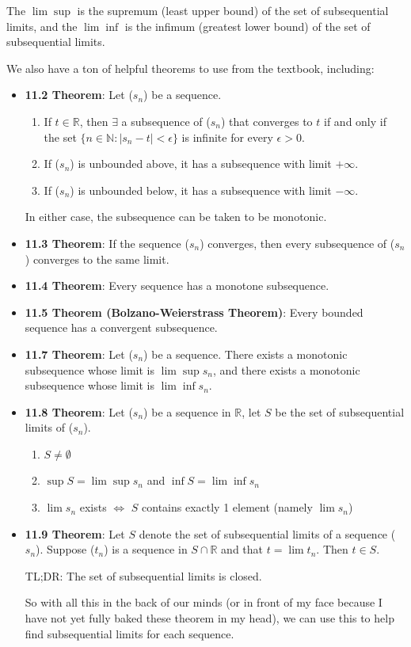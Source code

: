 \documentclass[12pt]{article}
\begin{document}
The $\lim \sup$ is the supremum (least upper bound) of the set of subsequential limits, and the $\lim \inf$ is the infimum (greatest lower bound) of the set of subsequential limits.
 
We also have a ton of helpful theorems to use from the textbook, including:
\begin{itemize}
    \item \textbf{11.2 Theorem}: Let ($s_n$) be a sequence. 
    \begin{enumerate}[label=(\roman*)]
        \item If $t \in \mathbb{R}$, then $\exists$ a subsequence of ($s_n$) that converges to $t$ if and only if the set $\{ n \in \mathbb{N} \colon | s_n - t | < \epsilon \}$ is infinite for every $\epsilon > 0$.
        \item If ($s_n$) is unbounded above, it has a subsequence with limit $+\infty$.
        \item If ($s_n$) is unbounded below, it has a subsequence with limit $-\infty$.
    \end{enumerate}
    \indent In either case, the subsequence can be taken to be monotonic.
    \item \textbf{11.3 Theorem}: If the sequence ($s_n$) converges, then every subsequence of ($s_n$) converges to the same limit.
    \item \textbf{11.4 Theorem}: Every sequence has a monotone subsequence.
    \item \textbf{11.5 Theorem (Bolzano-Weierstrass Theorem)}: Every bounded sequence has a convergent subsequence.
    \item \textbf{11.7 Theorem}: Let ($s_n$) be a sequence. There exists a monotonic subsequence whose limit is $\lim \sup s_n$, and there exists a monotonic subsequence whose limit is $\lim \inf s_n$.
    \item \textbf{11.8 Theorem}: Let ($s_n$) be a sequence in $\mathbb{R}$, let $S$ be the set of subsequential limits of ($s_n$).
    \begin{enumerate}[label=(\roman*)]
        \item $S \neq \emptyset$
        \item $\sup S = \lim \sup s_n$ and $\inf S = \lim \inf s_n$
        \item $\lim s_n$ exists $\iff$ $S$ contains exactly 1 element (namely $\lim s_n$)
    \end{enumerate}
    \item \textbf{11.9 Theorem}: Let $S$ denote the set of subsequential limits of a sequence ($s_n$). Suppose ($t_n$) is a sequence in $S \cap \mathbb{R}$ and that $t = \lim t_n$. Then $t \in S$.
    
    TL;DR: The set of subsequential limits is closed.

    So with all this in the back of our minds (or in front of my face because I have not yet fully baked these theorem in my head), we can use this to help find subsequential limits for each sequence.
\end{itemize}
\end{document}
